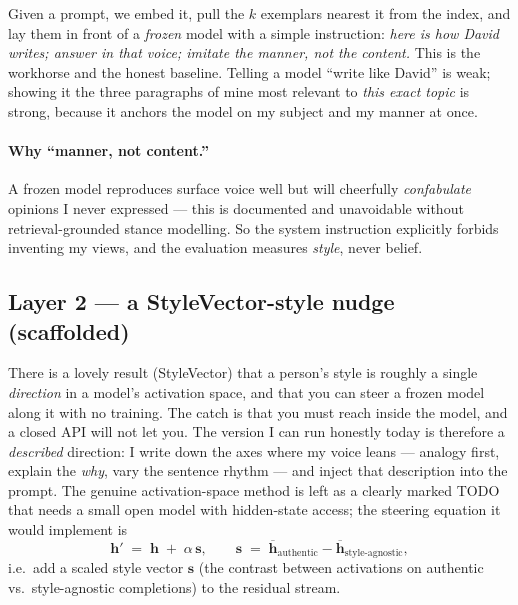 \documentclass[11pt]{article}
\begin{document}
Given a prompt, we embed it, pull the $k$ exemplars nearest it from the index, and lay them in front
of a \emph{frozen} model with a simple instruction: \emph{here is how David writes; answer in that
voice; imitate the manner, not the content.} This is the workhorse and the honest baseline. Telling a
model ``write like David'' is weak; showing it the three paragraphs of mine most relevant to
\emph{this exact topic} is strong, because it anchors the model on my subject and my manner at once.

\paragraph{Why ``manner, not content.''} A frozen model reproduces surface voice well but will
cheerfully \emph{confabulate} opinions I never expressed --- this is documented and unavoidable
without retrieval-grounded stance modelling. So the system instruction explicitly forbids inventing
my views, and the evaluation measures \emph{style}, never belief.

\subsection{Layer 2 --- a StyleVector-style nudge (scaffolded)}

There is a lovely result (StyleVector) that a person's style is roughly a single \emph{direction} in
a model's activation space, and that you can steer a frozen model along it with no training. The
catch is that you must reach inside the model, and a closed API will not let you. The version I can
run honestly today is therefore a \emph{described} direction: I write down the axes where my voice
leans --- analogy first, explain the \emph{why}, vary the sentence rhythm --- and inject that
description into the prompt. The genuine activation-space method is left as a clearly marked TODO that
needs a small open model with hidden-state access; the steering equation it would implement is
\[
  \mathbf{h}' \;=\; \mathbf{h} \;+\; \alpha\,\mathbf{s},
  \qquad
  \mathbf{s} \;=\;
  \overline{\mathbf{h}}_{\text{authentic}} - \overline{\mathbf{h}}_{\text{style-agnostic}},
\]
i.e.\ add a scaled style vector $\mathbf{s}$ (the contrast between activations on authentic vs.\
style-agnostic completions) to the residual stream.

\end{document}
